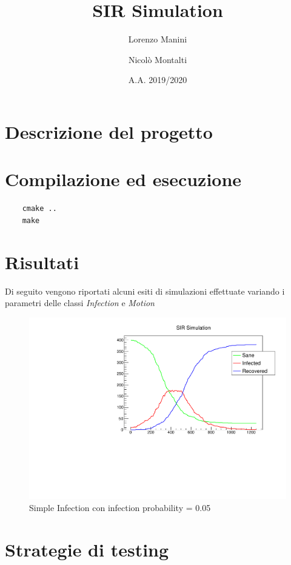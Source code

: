 \documentclass[a4paper,10pt,twocolumn]{article}
\begin{document}
\title{SIR Simulation}
\author{Lorenzo Manini \and Nicolò Montalti}
\date{A.A. 2019/2020}

\maketitle

\section{Descrizione del progetto}
\section{Compilazione ed esecuzione}

\begin{verbatim}
    cmake ..
    make
\end{verbatim}

\section{Risultati}
Di seguito vengono riportati alcuni esiti di simulazioni effettuate variando i parametri delle classi \emph{Infection} e \emph{Motion}

\begin{figure}
    \caption{Simple Infection con infection probability = 0.05}
    \label{fig:simple_005}
    \centering
    \includegraphics[width=\linewidth]{images/simple_0.05.pdf}
\end{figure}

\section{Strategie di testing}
\end{document}
